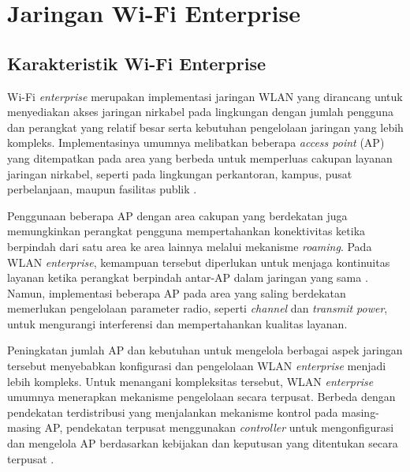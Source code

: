 


\section{Jaringan Wi-Fi Enterprise}

\subsection{Karakteristik Wi-Fi Enterprise}

Wi-Fi \textit{enterprise} merupakan implementasi jaringan WLAN yang dirancang untuk menyediakan akses jaringan nirkabel pada lingkungan dengan jumlah pengguna dan perangkat yang relatif besar serta kebutuhan pengelolaan jaringan yang lebih kompleks. Implementasinya umumnya melibatkan beberapa \textit{access point} (AP) yang ditempatkan pada area yang berbeda untuk memperluas cakupan layanan jaringan nirkabel, seperti pada lingkungan perkantoran, kampus, pusat perbelanjaan, maupun fasilitas publik \parencite{SEQUEIRA_BUILDING_2017}.

Penggunaan beberapa AP dengan area cakupan yang berdekatan juga memungkinkan perangkat pengguna mempertahankan konektivitas ketika berpindah dari satu area ke area lainnya melalui mekanisme \textit{roaming}. Pada WLAN \textit{enterprise}, kemampuan tersebut diperlukan untuk menjaga kontinuitas layanan ketika perangkat berpindah antar-AP dalam jaringan yang sama \parencite{GERACI_WIFI_2025}. Namun, implementasi beberapa AP pada area yang saling berdekatan memerlukan pengelolaan parameter radio, seperti \textit{channel} dan \textit{transmit power}, untuk mengurangi interferensi dan mempertahankan kualitas layanan.

Peningkatan jumlah AP dan kebutuhan untuk mengelola berbagai aspek jaringan tersebut menyebabkan konfigurasi dan pengelolaan WLAN \textit{enterprise} menjadi lebih kompleks. Untuk menangani kompleksitas tersebut, WLAN \textit{enterprise} umumnya menerapkan mekanisme pengelolaan secara terpusat. Berbeda dengan pendekatan terdistribusi yang menjalankan mekanisme kontrol pada masing-masing AP, pendekatan terpusat menggunakan \textit{controller} untuk mengonfigurasi dan mengelola AP berdasarkan kebijakan dan keputusan yang ditentukan secara terpusat \parencite{DEZFOULI_REVIEW_2019}.


